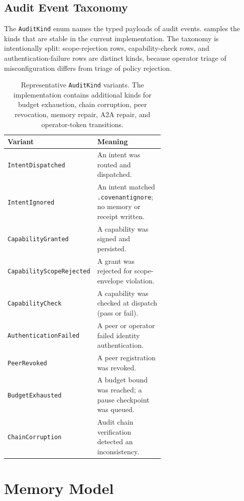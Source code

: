 \documentclass[11pt]{article}
\theoremstyle{plainsmall}
\begin{document}
\subsection{Audit Event Taxonomy}

The \texttt{AuditKind} enum names the typed payloads of audit events.  samples the kinds that are stable in the current implementation. The taxonomy is intentionally split: scope-rejection rows, capability-check rows, and authentication-failure rows are distinct kinds, because operator triage of misconfiguration differs from triage of policy rejection.

\begin{table}[h]
\centering
\caption{Representative \texttt{AuditKind} variants. The implementation contains additional kinds for budget exhaustion, chain corruption, peer revocation, memory repair, A2A repair, and operator-token transitions.}
\label{tab:audit-kinds}
\small
\begin{tabular}{@{}lp{0.62\linewidth}@{}}
\toprule
Variant & Meaning \\
\midrule
\texttt{IntentDispatched}              & An intent was routed and dispatched. \\
\texttt{IntentIgnored}                 & An intent matched \texttt{.covenantignore}; no memory or receipt written. \\
\texttt{CapabilityGranted}             & A capability was signed and persisted. \\
\texttt{CapabilityScopeRejected}       & A grant was rejected for scope-envelope violation. \\
\texttt{CapabilityCheck}               & A capability was checked at dispatch (pass or fail). \\
\texttt{AuthenticationFailed}          & A peer or operator failed identity authentication. \\
\texttt{PeerRevoked}                   & A peer registration was revoked. \\
\texttt{BudgetExhausted}               & A budget bound was reached; a pause checkpoint was queued. \\
\texttt{ChainCorruption}               & Audit chain verification detected an inconsistency. \\
\bottomrule
\end{tabular}
\end{table}

\section{Memory Model}
\label{sec:mem}
\end{document}
